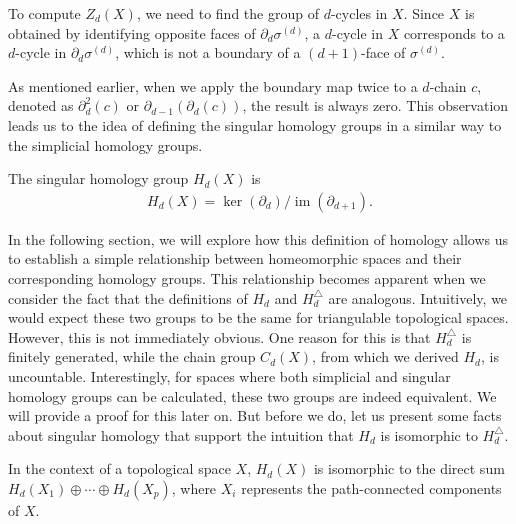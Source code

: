 To compute \( Z_{d}(X) \), we need to find the group of \( d \)-cycles in \( X \). Since \( X \) is obtained by identifying opposite faces of \( \partial_{d} \sigma^{(d)} \), a \( d \)-cycle in \( X \) corresponds to a \( d \)-cycle in \( \partial_{d} \sigma^{(d)} \), which is not a boundary of a \( (d+1) \)-face of \( \sigma^{(d)} \).

As mentioned earlier, when we apply the boundary map twice to a \( d \)-chain \( c \), denoted as \( \partial^{2}_d(c) \) or \( \partial_{d-1}(\partial_{d}(c)) \), the result is always zero. This observation leads us to the idea of defining the singular homology groups in a similar way to the simplicial homology groups.

\begin{definition}
	The singular homology group \( H_{d}(X) \) is
	\begin{align}
		H_{d}(X) = \ker(\partial_{d}) / \operatorname{im}(\partial_{d+1}). 
	\end{align}
\end{definition}

In the following section, we will explore how this definition of homology allows us to establish a simple relationship between homeomorphic spaces and their corresponding homology groups. This relationship becomes apparent when we consider the fact that the definitions of \( H_{d} \) and \( H^{\triangle}_{d} \) are analogous. Intuitively, we would expect these two groups to be the same for triangulable topological spaces. However, this is not immediately obvious. One reason for this is that \( H^{\triangle}_{d} \) is finitely generated, while the chain group \( C_{d}(X) \), from which we derived \( H_{d} \), is uncountable. Interestingly, for spaces where both simplicial and singular homology groups can be calculated, these two groups are indeed equivalent. We will provide a proof for this later on. But before we do, let us present some facts about singular homology that support the intuition that \( H_{d} \) is isomorphic to \( H^{\triangle}_{d} \).

\begin{proposition}{\cite[Proposition 2.6]{hatcher2005algebraic}}
	In the context of a topological space \( X \), \( H_{d}(X) \) is isomorphic to the direct sum \( H_{d}(X_{1}) \oplus \cdots \oplus H_{d}(X_{p}) \), where \( X_{i} \) represents the path-connected components of \( X \).
\end{proposition}

